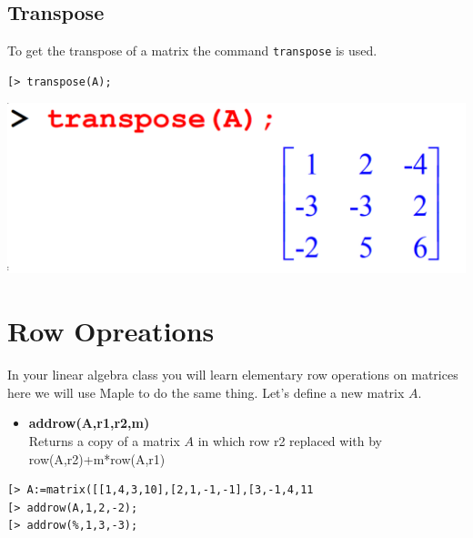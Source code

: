 \documentclass[
]{book}
\providecommand{\tightlist}{%
  \setlength{\itemsep}{0pt}\setlength{\parskip}{0pt}}
\theoremstyle{definition}
\theoremstyle{definition}
\theoremstyle{definition}
\theoremstyle{definition}
\theoremstyle{remark}
\begin{document}
\subsection{Transpose}\label{transpose}

To get the transpose of a matrix the command \texttt{transpose} is used.

\begin{verbatim}
[> transpose(A);
\end{verbatim}

\includegraphics{figures/Lesson 4/fig27.png}

\section{Row Opreations}\label{row-opreations}

In your linear algebra class you will learn elementary row operations on matrices here we will use Maple to do the same thing. Let's define a new matrix \(A\).

\begin{itemize}
\tightlist
\item
  \textbf{addrow(A,r1,r2,m)}\\
  Returns a copy of a matrix \(A\) in which row r2 replaced with by row(A,r2)+m*row(A,r1)
\end{itemize}

\begin{verbatim}
[> A:=matrix([[1,4,3,10],[2,1,-1,-1],[3,-1,4,11
[> addrow(A,1,2,-2);
[> addrow(%,1,3,-3);
\end{verbatim}
\end{document}
